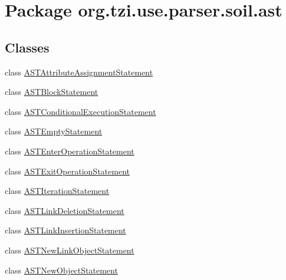 \hypertarget{namespaceorg_1_1tzi_1_1use_1_1parser_1_1soil_1_1ast}{\section{Package org.\-tzi.\-use.\-parser.\-soil.\-ast}
\label{namespaceorg_1_1tzi_1_1use_1_1parser_1_1soil_1_1ast}
}
\subsection*{Classes}
\begin{DoxyCompactItemize}
\item 
class \hyperlink{classorg_1_1tzi_1_1use_1_1parser_1_1soil_1_1ast_1_1_a_s_t_attribute_assignment_statement}{A\-S\-T\-Attribute\-Assignment\-Statement}
\item 
class \hyperlink{classorg_1_1tzi_1_1use_1_1parser_1_1soil_1_1ast_1_1_a_s_t_block_statement}{A\-S\-T\-Block\-Statement}
\item 
class \hyperlink{classorg_1_1tzi_1_1use_1_1parser_1_1soil_1_1ast_1_1_a_s_t_conditional_execution_statement}{A\-S\-T\-Conditional\-Execution\-Statement}
\item 
class \hyperlink{classorg_1_1tzi_1_1use_1_1parser_1_1soil_1_1ast_1_1_a_s_t_empty_statement}{A\-S\-T\-Empty\-Statement}
\item 
class \hyperlink{classorg_1_1tzi_1_1use_1_1parser_1_1soil_1_1ast_1_1_a_s_t_enter_operation_statement}{A\-S\-T\-Enter\-Operation\-Statement}
\item 
class \hyperlink{classorg_1_1tzi_1_1use_1_1parser_1_1soil_1_1ast_1_1_a_s_t_exit_operation_statement}{A\-S\-T\-Exit\-Operation\-Statement}
\item 
class \hyperlink{classorg_1_1tzi_1_1use_1_1parser_1_1soil_1_1ast_1_1_a_s_t_iteration_statement}{A\-S\-T\-Iteration\-Statement}
\item 
class \hyperlink{classorg_1_1tzi_1_1use_1_1parser_1_1soil_1_1ast_1_1_a_s_t_link_deletion_statement}{A\-S\-T\-Link\-Deletion\-Statement}
\item 
class \hyperlink{classorg_1_1tzi_1_1use_1_1parser_1_1soil_1_1ast_1_1_a_s_t_link_insertion_statement}{A\-S\-T\-Link\-Insertion\-Statement}
\item 
class \hyperlink{classorg_1_1tzi_1_1use_1_1parser_1_1soil_1_1ast_1_1_a_s_t_new_link_object_statement}{A\-S\-T\-New\-Link\-Object\-Statement}
\item 
class \hyperlink{classorg_1_1tzi_1_1use_1_1parser_1_1soil_1_1ast_1_1_a_s_t_new_object_statement}{A\-S\-T\-New\-Object\-Statement}

\end{DoxyCompactItemize}
